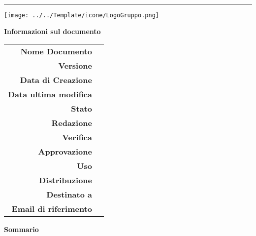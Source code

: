 \begin{center}

\begin{large} \textbf{\progetto} \end{large}
\vspace{0.2em}

\hrule
\vspace{7em}

\texttt{[image: ../../Template/icone/LogoGruppo.png]}

\thispagestyle{empty}

\vspace{1.5em}

\begin{center} 
  \begin{Huge}
  {\fontsize{15mm}{20mm}\selectfont \gruppoLink} 
  \end{Huge}
\end{center}

\vfill

\begin{Huge} \documento \end{Huge}

\begin{center}
\textbf{Informazioni sul documento} \\ \vspace{2em}
\small
\begin{tabular}{r|l}
	\textbf{Nome Documento} & \nomedocumentofisico \\
	\textbf{Versione}	& \versione\\
	\textbf{Data di Creazione} & \datacreazione\\
	\textbf{Data ultima modifica} & \datamodifica\\
	\textbf{Stato} & \stato \\
	\textbf{Redazione}	& \redazione\\
	\textbf{Verifica}	& \verifica\\
	\textbf{Approvazione}	& \approvazione\\
	\textbf{Uso}  & \uso\\
	\textbf{Distribuzione} & \gruppo \\
	\textbf{Destinato a}  &  \destinateTo \\
	\textbf{Email di riferimento} & \email
\end{tabular}
\end{center}

\normalsize
\textbf{Sommario\\} 

\end{center}
\clearpage
